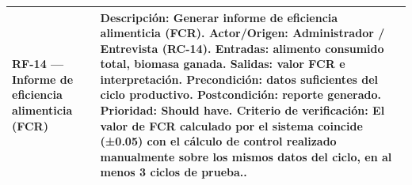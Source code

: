 \documentclass[11pt,a4paper]{article}
\begin{document}
\begin{longtable}{|p{3.5cm}|p{12cm}|}
\textbf{RF-14 — Informe de eficiencia alimenticia (FCR)} &
\textbf{Descripción:} Generar informe de eficiencia alimenticia (FCR). \newline
\textbf{Actor/Origen:} Administrador / Entrevista (RC-14). \newline
\textbf{Entradas:} alimento consumido total, biomasa ganada. \newline
\textbf{Salidas:} valor FCR e interpretación. \newline
\textbf{Precondición:} datos suficientes del ciclo productivo. \newline
\textbf{Postcondición:} reporte generado. \newline
\textbf{Prioridad:} Should have. \newline
\textbf{Criterio de verificación:} El valor de FCR calculado por el sistema coincide (±0.05) con el cálculo de control realizado manualmente sobre los mismos datos del ciclo, en al menos 3 ciclos de prueba.. \\ \hline

\end{longtable}
\end{document}
